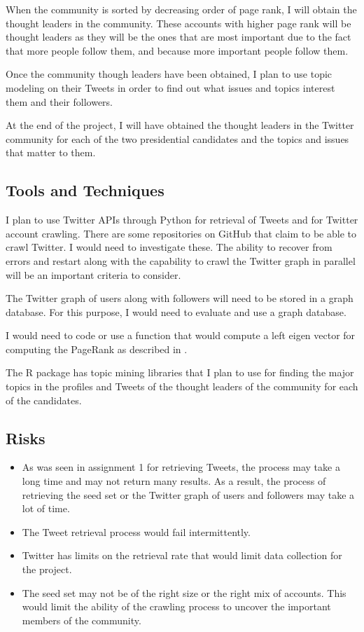 \documentclass{sig-alternate-05-2015}
\begin{document}
When the community is sorted by decreasing order of page rank, I will obtain the thought leaders in the community. These accounts with higher page rank will be thought leaders as they will be the ones that are most important due to the fact that more people follow them, and because more important people follow them.

Once the community though leaders have been obtained, I plan to use topic modeling on their Tweets in order to find out what issues and topics interest them and their followers.

At the end of the project, I will have obtained the thought leaders in the Twitter community for each of the two presidential candidates and the topics and issues that matter to them.

\subsection{Tools and Techniques}

I plan to use Twitter APIs through Python for retrieval of Tweets and for Twitter account crawling. There are some repositories on GitHub that claim to be able to crawl Twitter. I would need to investigate these. The ability to recover from errors and restart along with the capability to crawl the Twitter graph in parallel will be an important criteria to consider.

The Twitter graph of users along with followers will need to be stored in a graph database. For this purpose, I would need to evaluate and use a graph database.

I would need to code or use a function that would compute a left eigen vector for computing the PageRank as described in \cite{IRB}.

The R package has topic mining libraries that I plan to use for finding the major topics in the profiles and Tweets of the thought leaders of the community for each of the candidates.

\subsection{Risks}
\begin{itemize}
\item As was seen in assignment 1 for retrieving Tweets, the process may take a long time and may not return many results. As a result, the process of retrieving the seed set or the Twitter graph of users and followers may take a lot of time.

\item The Tweet retrieval process would fail intermittently.

\item Twitter has limits on the retrieval rate that would limit data collection for the project.

\item The seed set may not be of the right size or the right mix of accounts. This would limit the ability of the crawling process to uncover the important members of the community.

\end{itemize}
\end{document}
